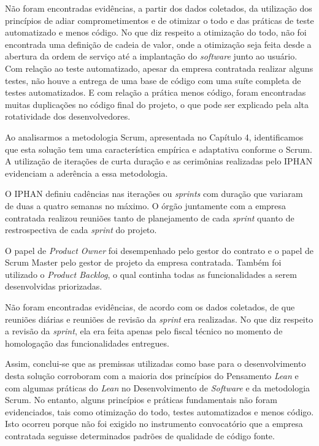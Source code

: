 Não foram encontradas evidências, a partir dos dados coletados, da utilização dos princípios de adiar comprometimentos e de otimizar o todo e das práticas de teste automatizado e menos código. No que diz respeito a otimização do todo, não foi encontrada uma definição de cadeia de valor, onde a otimização seja feita desde a abertura da ordem de serviço até a implantação do \textit{software} junto ao usuário. Com relação ao teste automatizado, apesar da empresa contratada realizar alguns testes, não houve a entrega de uma base de código com uma suíte completa de testes automatizados. E com relação a prática menos código, foram encontradas muitas duplicações no código final do projeto, o que pode ser explicado pela alta rotatividade dos desenvolvedores.

Ao analisarmos a metodologia Scrum, apresentada no Capítulo 4, identificamos que esta solução tem uma característica empírica e adaptativa conforme o Scrum. A utilização de iterações de curta duração e as cerimônias realizadas pelo IPHAN evidenciam a aderência a essa metodologia.

O IPHAN definiu cadências nas iterações ou \textit{sprints} com duração que variaram de duas a quatro semanas no máximo. O órgão juntamente com a empresa contratada realizou reuniões tanto de planejamento de cada \textit{sprint} quanto de restrospectiva de cada \textit{sprint} do projeto. 

O papel de \textit{Product Owner} foi desempenhado pelo gestor do contrato e o papel de Scrum Master pelo gestor de projeto da empresa contratada. Também foi utilizado o \textit{Product Backlog}, o qual continha todas as funcionalidades a serem desenvolvidas priorizadas. 

Não foram encontradas evidências, de acordo com os dados coletados, de que reuniões diárias e reuniões de revisão da \textit{sprint} era realizadas. No que diz respeito a revisão da \textit{sprint}, ela era feita apenas pelo fiscal técnico no momento de homologação das funcionalidades entregues.

Assim, conclui-se que as premissas utilizadas como base para o desenvolvimento desta solução corroboram com a maioria dos princípios do Pensamento \textit{Lean} e com algumas práticas do \textit{Lean} no Desenvolvimento de \textit{Software} e da metodologia Scrum. No entanto, alguns princípios e práticas fundamentais não foram evidenciados, tais como otimização do todo, testes automatizados e menos código. Isto ocorreu porque não foi exigido no instrumento convocatório que a empresa contratada seguisse determinados padrões de qualidade de código fonte.

